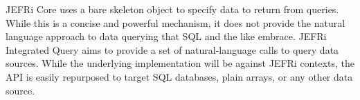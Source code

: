 \documentclass{article}
\begin{document}
\maketitle
\tableofcontents
\newpage
\linespread{1.6}
JEFRi Core uses a bare skeleton object to specify data to return from queries.
While this is a concise and powerful mechanism, it does not provide the
natural language approach to data querying that SQL and the like embrace.
JEFRi Integrated Query aims to provide a set of natural-language calls to
query data sources. While the underlying implementation will be against JEFRi
contexts, the API is easily repurposed to target SQL databases, plain arrays,
or any other data source.


\end{document}
